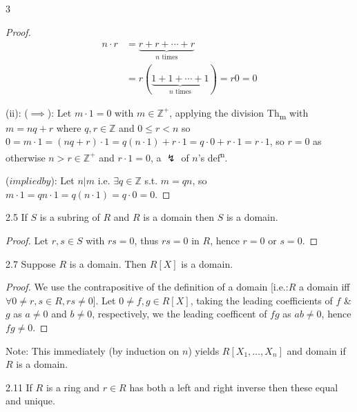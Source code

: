 \documentclass[8pt]{extarticle}
\begin{document}
\begin{multicols}{3}
\begin{proof}
            \vspace{-15pt}
            \begin{align*}
                n\cdot r&=\underbrace{r+r+\cdots+r}_{n\text{ times}}\\
                &=r(\underbrace{1+1+\cdots+1}_{n\text{ times}})=r0=0
            \end{align*}
            \vspace{-10pt}

            (ii): (\(\implies\)): Let \(m\cdot 1=0\) with \(m\in\mathbb{Z}^+\), applying the division Th\textsubscript{m} with \(m=nq+r\) where \(q,r\in\mathbb{Z}\) and \(0\le r<n\) so \(0=m\cdot1=(nq+r)\cdot1=q(n\cdot1)+r\cdot1=q\cdot0+r\cdot1=r\cdot1\), so \(r=0\) as otherwise \(n>r\in\mathbb{Z}^+\) and \(r\cdot 1=0\), a \(\lightning\) of \(n\)'s def\textsuperscript{n}.

            (\(impliedby\)): Let \(n|m\) i.e. \(\exists q\in\mathbb{Z}\) s.t. \(m=qn\), so \(m\cdot1=qn\cdot1=q(n\cdot1)=q\cdot0=0\).
        \end{proof}


        \begin{lemma}{2.5}
            If \(S\) is a subring of \(R\) and \(R\) is a domain then \(S\) is a domain.
        \end{lemma}

        \begin{proof}
            Let \(r,s\in S\) with \(rs=0\), thus \(rs=0\) in \(R\), hence \(r=0\) or \(s=0\).
        \end{proof}

        \begin{proposition}{2.7}
            Suppose \(R\) is a domain. Then \(R[X]\) is a domain.
        \end{proposition}

        \begin{proof}
            We use the contrapositive of the definition of a domain [i.e.:\(R\) a domain iff \(\forall 0\ne r,s\in R, rs\ne 0\)]. Let \(0\ne f,g\in R[X]\), taking the leading coefficients of \(f\) \& \(g\) as \(a\ne0\) and \(b\ne0\), respectively, we the leading coefficent of \(fg\) as \(ab\ne0\), hence \(fg\ne0\).
        \end{proof}

        {\footnotesize Note: This immediately (by induction on \(n\)) yields \(R[X_1,\ldots,X_n]\) and domain if \(R\) is a domain.}

        \begin{lemma}{2.11}
            If \(R\) is a ring and \(r\in R\) has both a left and right inverse then these equal and unique.
        \end{lemma}


\end{multicols}
\end{document}
